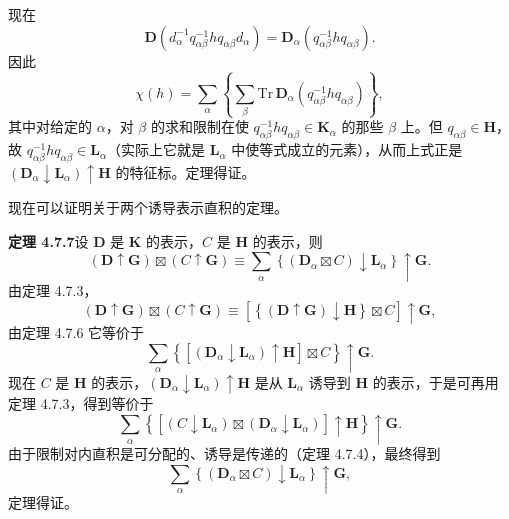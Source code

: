 现在
\begin{equation*}
\mathbf{D}(d^{-1}_{\alpha}q^{-1}_{\alpha\beta}hq_{\alpha\beta}d_{\alpha}) = \mathbf{D}_{\alpha}(q^{-1}_{\alpha\beta}hq_{\alpha\beta}).
\end{equation*}
因此
\begin{equation*}
\chi(h) = \sum_{\alpha}\left\{\sum_{\beta}\mathrm{Tr}\,\mathbf{D}_{\alpha}(q^{-1}_{\alpha\beta}hq_{\alpha\beta})\right\},
\tag{4.7.24}
\end{equation*}
其中对给定的 $\alpha$，对 $\beta$ 的求和限制在使 $q^{-1}_{\alpha\beta}hq_{\alpha\beta} \in \mathbf{K}_{\alpha}$ 的那些 $\beta$ 上。但 $q_{\alpha\beta} \in \mathbf{H}$，故 $q^{-1}_{\alpha\beta}hq_{\alpha\beta} \in \mathbf{L}_{\alpha}$（实际上它就是 $\mathbf{L}_{\alpha}$ 中使等式成立的元素），从而上式正是 $(\mathbf{D}_{\alpha} \downarrow \mathbf{L}_{\alpha}) \uparrow \mathbf{H}$ 的特征标。定理得证。

现在可以证明关于两个诱导表示直积的定理。

\noindent\textbf{定理 4.7.7}\quad 设 $\mathbf{D}$ 是 $\mathbf{K}$ 的表示，$C$ 是 $\mathbf{H}$ 的表示，则
\begin{equation*}
(\mathbf{D} \uparrow \mathbf{G}) \boxtimes (C \uparrow \mathbf{G}) \equiv \sum_{\alpha}\left\{\left(\mathbf{D}_{\alpha} \boxtimes C\right) \downarrow \mathbf{L}_{\alpha}\right\} \uparrow \mathbf{G}.
\tag{4.7.25}
\end{equation*}
由定理 4.7.3，
\begin{equation*}
(\mathbf{D} \uparrow \mathbf{G}) \boxtimes (C \uparrow \mathbf{G}) \equiv \left[\left\{(\mathbf{D} \uparrow \mathbf{G}) \downarrow \mathbf{H}\right\} \boxtimes C\right] \uparrow \mathbf{G},
\end{equation*}
由定理 4.7.6 它等价于
\begin{equation*}
\sum_{\alpha}\left\{\left[(\mathbf{D}_{\alpha} \downarrow \mathbf{L}_{\alpha}) \uparrow \mathbf{H}\right] \boxtimes C\right\} \uparrow \mathbf{G}.
\end{equation*}
现在 $C$ 是 $\mathbf{H}$ 的表示，$(\mathbf{D}_{\alpha} \downarrow \mathbf{L}_{\alpha}) \uparrow \mathbf{H}$ 是从 $\mathbf{L}_{\alpha}$ 诱导到 $\mathbf{H}$ 的表示，于是可再用定理 4.7.3，得到等价于
\begin{equation*}
\sum_{\alpha}\left\{\left[(C \downarrow \mathbf{L}_{\alpha}) \boxtimes (\mathbf{D}_{\alpha} \downarrow \mathbf{L}_{\alpha})\right] \uparrow \mathbf{H}\right\} \uparrow \mathbf{G}.
\end{equation*}
由于限制对内直积是可分配的、诱导是传递的（定理 4.7.4），最终得到
\begin{equation*}
\sum_{\alpha}\left\{\left(\mathbf{D}_{\alpha} \boxtimes C\right) \downarrow \mathbf{L}_{\alpha}\right\} \uparrow \mathbf{G},
\end{equation*}
定理得证。

